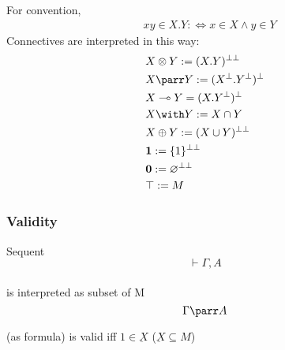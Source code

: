 \documentclass[dvipdfmx,cjk]{beamer}
\theoremstyle{example}
\begin{document}
\begin{frame}
  \begin{definition}
    For convention,
    \begin{align*}
      & xy \in X.Y :\Leftrightarrow x \in X \land y \in Y 
    \end{align*}
    Connectives are interpreted in this way:
    \begin{align*}
     & X \otimes Y := (X.Y)^{\bot\bot} \\
     & X \parr   Y := (X^\bot.Y^\bot)^\bot \\
     & X \multimap Y = (X.Y^\bot)^\bot \\
     & X \with Y := X \cap Y \\
     & X \oplus Y := (X \cup Y)^{\bot\bot} \\
     & \textbf{1} := \{1\}^{\bot\bot} \\
     & \textbf{0} := \varnothing^{\bot\bot} \\
     & \top := M
    \end{align*}
  \end{definition}
\end{frame}

\begin{frame}
  \frametitle{Validity}
  \begin{definition}
    Sequent \\
    \[ \vdash \Gamma, A\] \\
    is interpreted as subset of M \\
    \[ \Gamma \parr A \]
  \end{definition}
  
  \begin{definition}{ (as formula) is valid} iff
    $ 1 \in \underbar{X} $
    ($ \underbar{X} \subseteq M $)
  \end{definition}
\end{frame}
\end{document}
